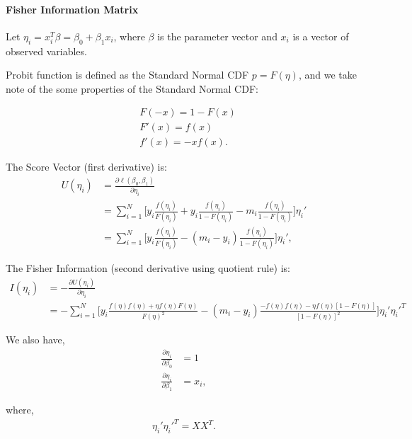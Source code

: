 \documentclass[11pt]{article}
\begin{document}
    \hypertarget{fisher-information-matrix}{%
\paragraph{Fisher Information Matrix}\label{fisher-information-matrix}}

Let \(\eta_i = x_i^T\beta = \beta_0 + \beta_1x_i\), where \(\beta\) is
the parameter vector and \(x_i\) is a vector of observed variables.

Probit function is defined as the Standard Normal CDF \(p = F(\eta)\),
and we take note of the some properties of the Standard Normal CDF:

\begin{align*}
    & F(-x) = 1 - F(x) \\
    & F'(x) = f(x) \\
    & f'(x) = -xf(x).
\end{align*}

The Score Vector (first derivative) is: \begin{align*}
    U(\eta_i) &= \frac{\partial\ell(\beta_0,\beta_1)}{\partial\eta_i} \\
    &= \sum^N_{i=1}\bigg[y_i\frac{f(\eta_i)}{F(\eta_i)} + y_i\frac{f(\eta_i)}{1 - F(\eta_i)} - m_i\frac{f(\eta_i)}{1 - F(\eta_i)}\bigg]\eta_i' \\
    &= \sum^N_{i=1}\bigg[y_i\frac{f(\eta_i)}{F(\eta_i)} - (m_i - y_i)\frac{f(\eta_i)}{1 - F(\eta_i)}\bigg]\eta_i',
\end{align*}

The Fisher Information (second derivative using quotient rule) is:
\begin{align*}
    I(\eta_i) &= -\frac{\partial U(\eta_i)}{\partial\eta_i} \\
    &= -\sum^N_{i=1}\bigg[y_i\frac{f(\eta)f(\eta) + \eta f(\eta)F(\eta)}{F(\eta)^2} - (m_i - y_i)\frac{-f(\eta)f(\eta)-\eta f(\eta)[1 - F(\eta)]}{[1 - F(\eta)]^2}\bigg]\eta_i'\eta_i'^T
\end{align*}

We also have, \begin{align*}
    \frac{\partial\eta_i}{\partial\beta_0} &= 1 \\
    \frac{\partial\eta_i}{\partial\beta_1} &= x_i,
\end{align*}

where, \begin{align*}
    \eta_i'\eta_i'^T = XX^T.
\end{align*}
\end{document}
